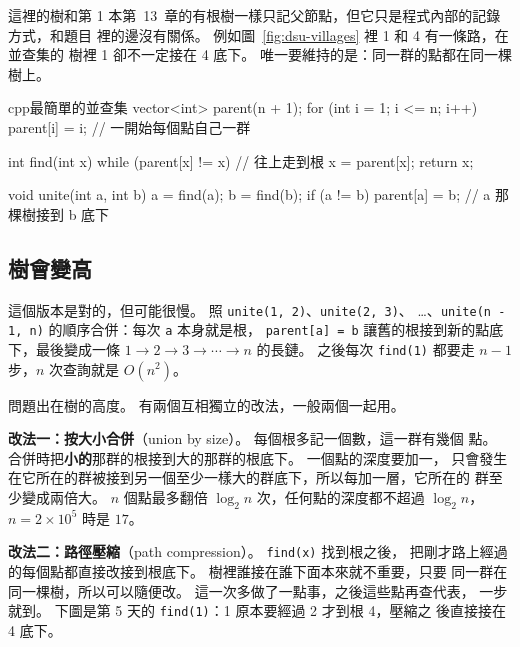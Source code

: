 這裡的樹和第 1 本第~13~章的有根樹一樣只記父節點，但它只是程式內部的記錄方式，和題目
裡的邊沒有關係。 例如圖~\ref{fig:dsu-villages} 裡 1 和 4 有一條路，在並查集的
樹裡 1 卻不一定接在 4 底下。 唯一要維持的是：同一群的點都在同一棵樹上。

\begin{code}{cpp}{最簡單的並查集}
vector<int> parent(n + 1);
for (int i = 1; i <= n; i++) {
    parent[i] = i;                     // 一開始每個點自己一群
}

int find(int x) {
    while (parent[x] != x) {           // 往上走到根
        x = parent[x];
    }
    return x;
}

void unite(int a, int b) {
    a = find(a);
    b = find(b);
    if (a != b) {
        parent[a] = b;                 // a 那棵樹接到 b 底下
    }
}
\end{code}

\subsection{樹會變高}

這個版本是對的，但可能很慢。 照 \texttt{unite(1, 2)}、\texttt{unite(2, 3)}、
\ldots、\texttt{unite(n - 1, n)} 的順序合併：每次 \texttt{a} 本身就是根，
\texttt{parent[a] = b} 讓舊的根接到新的點底下，最後變成一條
$1 \to 2 \to 3 \to \cdots \to n$ 的長鏈。 之後每次 \texttt{find(1)} 都要走
$n - 1$ 步，$n$ 次查詢就是 $O(n^2)$。

問題出在樹的高度。 有兩個互相獨立的改法，一般兩個一起用。

\textbf{改法一：按大小合併}（union by size）。 每個根多記一個數，這一群有幾個
點。 合併時把\textbf{小的}那群的根接到大的那群的根底下。 一個點的深度要加一，
只會發生在它所在的群被接到另一個至少一樣大的群底下，所以每加一層，它所在的
群至少變成兩倍大。 $n$ 個點最多翻倍 $\log_2 n$ 次，任何點的深度都不超過
$\log_2 n$，$n = 2 \times 10^5$ 時是 $17$。

\textbf{改法二：路徑壓縮}（path compression）。 \texttt{find(x)} 找到根之後，
把剛才路上經過的每個點都直接改接到根底下。 樹裡誰接在誰下面本來就不重要，只要
同一群在同一棵樹，所以可以隨便改。 這一次多做了一點事，之後這些點再查代表，
一步就到。 下圖是第 5 天的 \texttt{find(1)}：1 原本要經過 2 才到根 4，壓縮之
後直接接在 4 底下。

